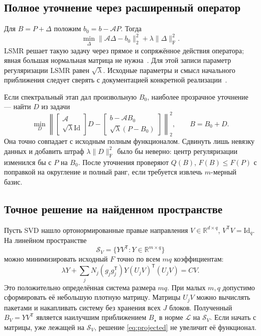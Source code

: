 \documentclass[11pt,a4paper]{article}
\numberwithin{equation}{section}
\theoremstyle{remark}
\newcommand{\R}{\mathbb R}
\newcommand{\Id}{\mathrm{Id}}
\newcommand{\T}{^{\mathsf T}}
\newcommand{\F}{_{\mathrm F}}
\begin{document}
\subsection{Полное уточнение через расширенный оператор}\label{sec:fullsolve}
Для $B=P+\Delta$ положим $b_0=b-\mathcal A P$. Тогда
\begin{equation}\label{eq:fullcorrection}
 \min_\Delta\|\mathcal A\Delta-b_0\|_2^2+\lambda\|\Delta\|\F^2.
\end{equation}
LSMR решает такую задачу через прямое и сопряжённое действия оператора;
явная большая нормальная матрица не нужна~\cite{lsmr}.
Для этой записи параметр регуляризации LSMR равен $\sqrt\lambda$.
Исходные параметры и смысл начального приближения следует сверять с
документацией конкретной реализации~\cite{scipy}.

Если спектральный этап дал произвольную $B_0$, наиболее прозрачное
уточнение --- найти $D$ из задачи
\begin{equation}\label{eq:shifted}
 \min_D
 \left\|
 \begin{bmatrix}\mathcal A\\ \sqrt\lambda\Id\end{bmatrix}D-
 \begin{bmatrix}b-\mathcal A B_0\\\sqrt\lambda(P-B_0)\end{bmatrix}
 \right\|_2^2,
 \qquad B=B_0+D.
\end{equation}
Она точно совпадает с исходным полным функционалом.
Сдвинуть лишь невязку данных и добавить штраф $\lambda\|D\|\F^2$ было бы
неверно: центр регуляризации изменился бы с $P$ на $B_0$.
После уточнения проверяют $Q(B)$, $F(B)\le F(P)$ с поправкой на округление
и полный ранг, если требуется извлечь $m$-мерный базис.

\subsection{Точное решение на найденном пространстве}\label{sec:coarse}
Пусть SVD нашло ортонормированные правые направления
$V\in\R^{d\times q}$, $V\T V=\Id_q$. На линейном пространстве
\[
 \mathcal S_V=\{YV\T:Y\in\R^{m\times q}\}
\]
можно минимизировать исходный $F$ точно по всем $mq$ коэффициентам:
\begin{equation}\label{eq:projected}
 \lambda Y+\sum_jN_j(g_jg_j\T)Y(U_jV)\T(U_jV)=CV.
\end{equation}
Это положительно определённая система размера $mq$.
При малых $m,q$ допустимо сформировать её небольшую плотную матрицу.
Матрицы $U_jV$ можно вычислять пакетами и накапливать систему без хранения
всех $J$ блоков. Полученный $B_V=YV\T$ является наилучшим приближением
$B_\star$ в норме $\mathcal L$ на $\mathcal S_V$.
Если начать с матрицы, уже лежащей на $\mathcal S_V$, решение
\eqref{eq:projected} не увеличит её функционал.
\end{document}
